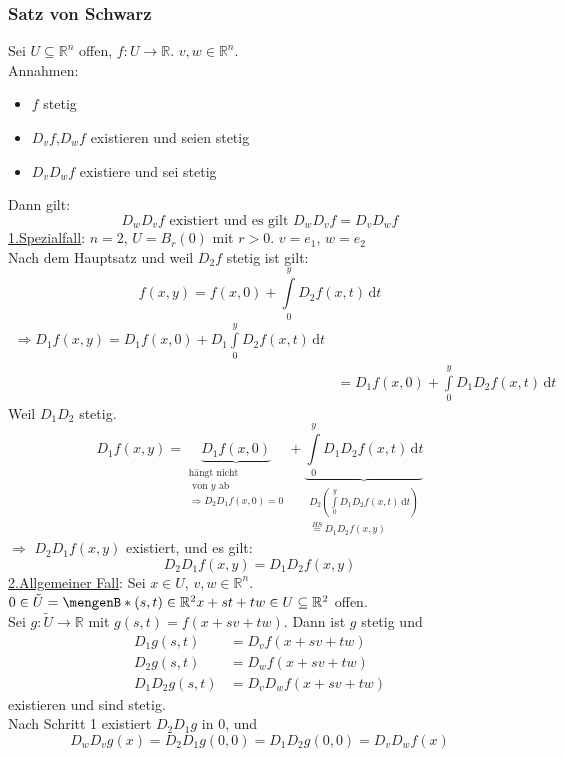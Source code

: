 \subsubsection{Satz von Schwarz} %
\label{ssub:satz_von_schwarz}
Sei $U \subseteq \mathbb{R}^n$ offen, $f: U \to \mathbb{R}$. $v,w \in \mathbb{R}^n$.\\
Annahmen: \begin{itemize}
	\item $f$ stetig
	\item $D_vf$,$D_wf$ existieren und seien stetig
	\item $D_vD_wf$ existiere und sei stetig
\end{itemize}
Dann gilt:
\[
	D_wD_vf \text{ existiert und es gilt } D_wD_vf= D_vD_wf
\]
\underline{1.Spezialfall}: $n=2$, $U=B_r(0)$ mit $r>0$. $v=e_1$, $w=e_2$ \\
Nach dem Hauptsatz und weil $D_2f$ stetig ist gilt:
\[
	f(x,y)= f(x,0)+\int\limits_{0}^{y}D_2f(x,t) \,\mathrm{d}t
\]
\begin{align*}
	\Rightarrow D_1f(x,y)=D_1f(x,0)+D_1 \int\limits_{0}^{y}D_2f(x,t) \,\mathrm{d}t \\
	&=D_1f(x,0)+ \int\limits_{0}^{y}D_1D_2f(x,t) \,\mathrm{d}t
\end{align*}
Weil $D_1D_2$ stetig.
\[
	D_1f(x,y)=\underset{\substack{\text{hängt nicht} \\\text{ von $y$ ab} \\ \Rightarrow D_2D_1f(x,0)=0}}{\underbrace{D_1f(x,0)}}+ \underset{\substack{D_2 \left( \int\limits_{0}^{y}D_1D_2f(x,t) \,\mathrm{d}t \right) \\ \stackrel{HS}{=}D_1D_2f(x,y) }}{\underbrace{\int\limits_{0}^{y}D_1D_2f(x,t) \,\mathrm{d}t}}
\]
$\Rightarrow$ $D_2D_1f(x,y)$ existiert, und es gilt:
\[
	D_2D_1f(x,y)= D_1D_2f(x,y)
\]
\underline{2.Allgemeiner Fall}: Sei $x \in U$, $v,w \in \mathbb{R}^n$. \\
$0 \in \tilde U= \set[(s,t)\in \mathbb{R}^2]{x+st+tw \in U} \subseteq \mathbb{R}^2$ offen. \\
Sei $g:\tilde U \to \mathbb{R}$ mit $g(s,t)=f(x+sv+tw)$. Dann ist $g$ stetig und
\begin{align*}
	D_1g(s,t) &= D_vf(x+sv+tw) \\
	D_2g(s,t) &= D_wf(x+sv+tw) \\
	D_1D_2g(s,t) &= D_vD_wf(x+sv+tw)
\end{align*}
existieren und sind stetig. \\
Nach Schritt 1 existiert $D_2D_1g$ in $0$, und \[
	D_wD_vg(x)= D_2D_1g(0,0)=D_1D_2g(0,0)=D_vD_wf(x)
\]
\bewende
